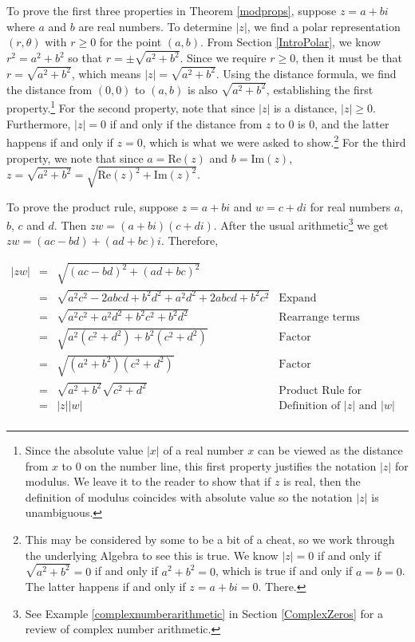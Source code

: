 To prove the first three properties in Theorem \ref{modprops}, suppose $z = a + bi$ where $a$ and $b$ are real numbers.  To determine $|z|$, we find a polar representation $(r,\theta)$ with $r \geq 0$ for the point $(a,b)$.  From Section \ref{IntroPolar}, we know $r^2 = a^2 + b^2$ so that $r = \pm \sqrt{a^2+b^2}$.  Since we require $r \geq 0$, then it must be that $r = \sqrt{a^2 +b^2}$, which means $|z| = \sqrt{a^2+b^2}$.  Using the distance formula, we find the distance from $(0,0)$ to $(a,b)$ is also $\sqrt{a^2+b^2}$, establishing the first property.\footnote{Since the absolute value $|x|$ of a real number $x$ can be viewed as the distance from $x$ to $0$ on the number line, this first property justifies the notation $|z|$ for modulus.  We leave it to the reader to show that if $z$ is real, then the definition of modulus coincides with absolute value so the notation $|z|$ is unambiguous.}  For the second property, note that since $|z|$ is a distance, $|z| \geq 0$.  Furthermore,  $|z| = 0$ if and only if the distance from $z$ to $0$ is $0$, and the latter happens if and only if $z = 0$, which is what we were asked to show.\footnote{This may be considered by some to be a bit of a cheat, so we work through the underlying Algebra to see this is true.  We know  $|z| = 0$ if and only if $\sqrt{a^2+b^2} = 0$ if and only if $a^2+b^2 = 0$, which is true if and only if $a = b = 0$.  The latter happens if and only if $z = a + bi =0$.  There.}  For the third property, we note that since $a = \text{Re}(z)$ and $b = \text{Im}(z)$, $z = \sqrt{a^2+b^2} = \sqrt{\text{Re}(z)^2 + \text{Im}(z)^2}$.

\smallskip

To prove the product rule, suppose $z = a + bi$ and  $w = c + di$ for real numbers $a$, $b$, $c$ and $d$.  Then $zw = (a+bi)(c+di)$.  After the usual arithmetic\footnote{See Example \ref{complexnumberarithmetic} in Section \ref{ComplexZeros} for a review of complex number arithmetic.} we get $zw = (ac-bd) + (ad+bc)i$. Therefore,

\[ \begin{array}{rcll}

|zw| & = & \sqrt{(ac-bd)^2+(ad+bc)^2} & \\[3pt]
		 & = & \sqrt{a^2c^2 - 2abcd + b^2d^2 + a^2d^2 +2abcd + b^2c^2} & \text{Expand} \\ [3pt]
		 & = & \sqrt{a^2c^2 + a^2d^2 + b^2c^2 + b^2d^2} & \text{Rearrange terms} \\[3pt]
		 & = & \sqrt{a^2\left(c^2+d^2\right) + b^2\left(c^2+d^2\right)} & \text{Factor} \\[3pt]
		 & = & \sqrt{\left(a^2+b^2\right)\left(c^2+d^2\right)} & \text{Factor}\\[3pt]
		 & = & \sqrt{a^2+b^2} \sqrt{c^2+d^2} & \text{Product Rule for Radicals} \\[3pt]
		 & = & |z| |w| & \text{Definition of $|z|$ and $|w|$} \\ \end{array} \]
		 
